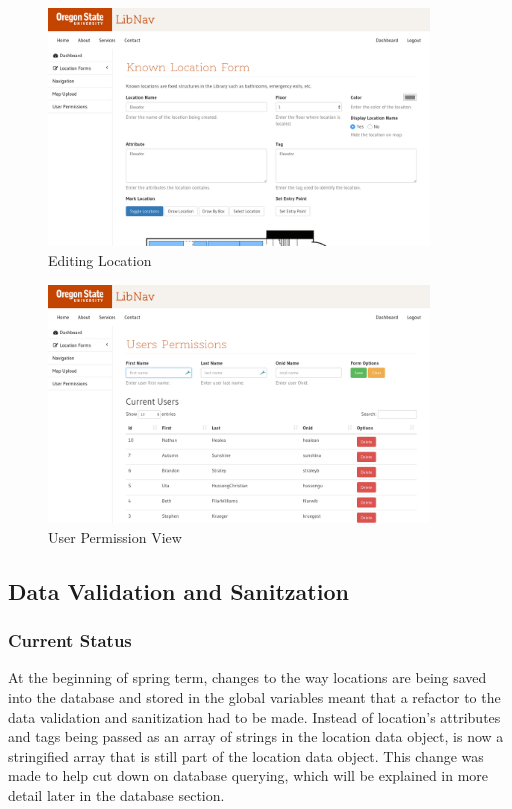 \documentclass[letterpaper,10pt,serif,titlepage, onecolumn, compsoc]{IEEEtran}
\begin{document}
\FloatBarrier
\begin{figure}[h!]
\centering
\captionsetup{justification=centering,margin=2cm}
\includegraphics[width=0.90\textwidth,natwidth=1200,natheight=800]{images/editing-location.png}
\caption{Editing Location}
\label{fig:method}
\end{figure}

\FloatBarrier
\begin{figure}[h!]
\centering
\captionsetup{justification=centering,margin=2cm}
\includegraphics[width=0.90\textwidth,natwidth=1200,natheight=800]{images/user-permission.png}
\caption{User Permission View}
\label{fig:method}
\end{figure}

\subsection{Data Validation and Sanitzation}
\subsubsection{Current Status}
At the beginning of spring term, changes to the way locations are being saved into the database and stored in the global variables meant that a refactor to the data validation and sanitization had to be made. Instead of location’s attributes and tags being passed as an array of strings in the location data object, is now a stringified array that is still part of the location data object. This change  was made to help cut down on database querying, which will be explained in more detail later in the database section. 
\end{document}
